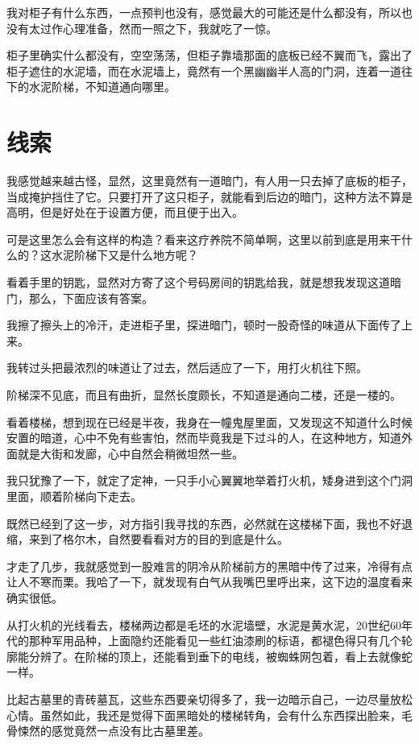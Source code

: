 我对柜子有什么东西，一点预判也没有，感觉最大的可能还是什么都没有，所以也没有太过作心理准备，然而一照之下，我就吃了一惊。

柜子里确实什么都没有，空空荡荡，但柜子靠墙那面的底板已经不翼而飞，露出了柜子遮住的水泥墙，而在水泥墙上，竟然有一个黑幽幽半人高的门洞，连着一道往下的水泥阶梯，不知道通向哪里。

\chapter{线索}

我感觉越来越古怪，显然，这里竟然有一道暗门，有人用一只去掉了底板的柜子，当成掩护挡住了它。只要打开了这只柜子，就能看到后边的暗门，这种方法不算是高明，但是好处在于设置方便，而且便于出入。

可是这里怎么会有这样的构造？看来这疗养院不简单啊，这里以前到底是用来干什么的？这水泥阶梯下又是什么地方呢？

看着手里的钥匙，显然对方寄了这个号码房间的钥匙给我，就是想我发现这道暗门，那么，下面应该有答案。

我擦了擦头上的冷汗，走进柜子里，探进暗门，顿时一股奇怪的味道从下面传了上来。

我转过头把最浓烈的味道让了过去，然后适应了一下，用打火机往下照。

阶梯深不见底，而且有曲折，显然长度颇长，不知道是通向二楼，还是一楼的。

看着楼梯，想到现在已经是半夜，我身在一幢鬼屋里面，又发现这不知道什么时候安置的暗道，心中不免有些害怕，然而毕竟我是下过斗的人，在这种地方，知道外面就是大街和发廊，心中自然会稍微坦然一些。

我只犹豫了一下，就定了定神，一只手小心翼翼地举着打火机，矮身进到这个门洞里面，顺着阶梯向下走去。

既然已经到了这一步，对方指引我寻找的东西，必然就在这楼梯下面，我也不好退缩，来到了格尔木，自然要看看对方的目的到底是什么。

才走了几步，我就感觉到一股难言的阴冷从阶梯前方的黑暗中传了过来，冷得有点让人不寒而栗。我哈了一下，就发现有白气从我嘴巴里呼出来，这下边的温度看来确实很低。

从打火机的光线看去，楼梯两边都是毛坯的水泥墙壁，水泥是黄水泥，20世纪60年代的那种军用品种，上面隐约还能看见一些红油漆刷的标语，都褪色得只有几个轮廓能分辨了。在阶梯的顶上，还能看到垂下的电线，被蜘蛛网包着，看上去就像蛇一样。

比起古墓里的青砖墓瓦，这些东西要亲切得多了，我一边暗示自己，一边尽量放松心情。虽然如此，我还是觉得下面黑暗处的楼梯转角，会有什么东西探出脸来，毛骨悚然的感觉竟然一点没有比古墓里差。

